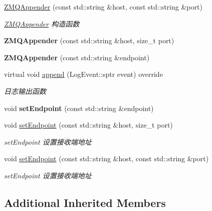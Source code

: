 \begin{DoxyCompactItemize}
\item 
\hyperlink{classdaq_1_1ZMQAppender_a5c1c6cbb077ebfecf379a143fc129981}{Z\+M\+Q\+Appender} (const std\+::string \&host, const std\+::string \&port)
\begin{DoxyCompactList}\small\item\em \hyperlink{classdaq_1_1ZMQAppender}{Z\+M\+Q\+Appender} 构造函数 \end{DoxyCompactList}\item 
\mbox{\label{classdaq_1_1ZMQAppender_af344358dc5f69ace2c6a17433e212c3b}} 
{\bfseries Z\+M\+Q\+Appender} (const std\+::string \&host, size\+\_\+t port)
\item 
\mbox{\label{classdaq_1_1ZMQAppender_ae0f7222da3cda887adcc064636f598ec}} 
{\bfseries Z\+M\+Q\+Appender} (const std\+::string \&endpoint)
\item 
virtual void \hyperlink{classdaq_1_1ZMQAppender_a3b69d9f380daa18c2527be0fed4f2d11}{append} (Log\+Event\+::sptr event) override
\begin{DoxyCompactList}\small\item\em 日志输出函数 \end{DoxyCompactList}\item 
\mbox{\label{classdaq_1_1ZMQAppender_aa5050735f74ccfc47765970250937584}} 
void {\bfseries set\+Endpoint} (const std\+::string \&endpoint)
\item 
void \hyperlink{classdaq_1_1ZMQAppender_a0d330bf4e03d7cce1f13e1be1fdf5581}{set\+Endpoint} (const std\+::string \&host, size\+\_\+t port)
\begin{DoxyCompactList}\small\item\em set\+Endpoint 设置接收端地址 \end{DoxyCompactList}\item 
void \hyperlink{classdaq_1_1ZMQAppender_a04132ad59cf83f8555f6fb6a4f8993d6}{set\+Endpoint} (const std\+::string \&host, const std\+::string \&port)
\begin{DoxyCompactList}\small\item\em set\+Endpoint 设置接收端地址 \end{DoxyCompactList}\end{DoxyCompactItemize}
\subsection*{Additional Inherited Members}


